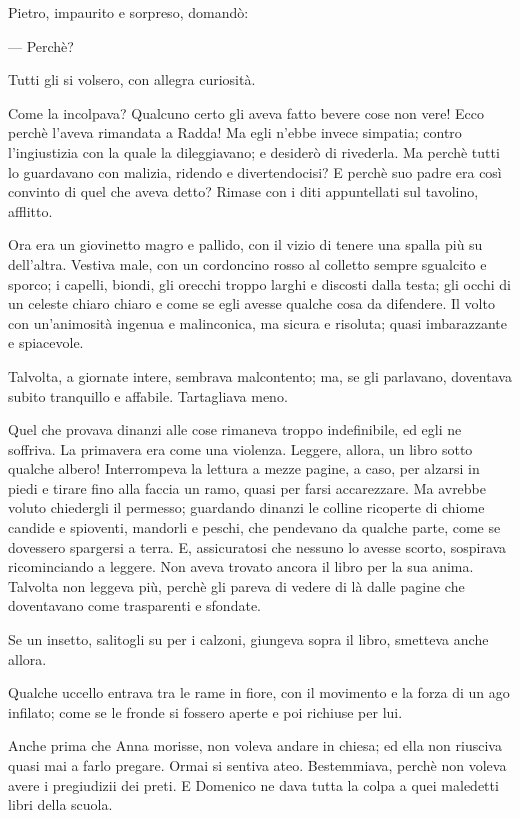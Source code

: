 Pietro, impaurito e sorpreso, domandò:

— Perchè?

Tutti gli si volsero, con allegra curiosità.

Come la incolpava? Qualcuno certo gli aveva fatto bevere cose non vere! Ecco perchè l'aveva rimandata a Radda! Ma egli n'ebbe invece simpatia; contro l'ingiustizia con la quale la dileggiavano; e desiderò di rivederla. Ma perchè tutti lo guardavano con malizia, ridendo e divertendocisi? E perchè suo padre era così convinto di quel che aveva detto? Rimase con i diti appuntellati sul tavolino, afflitto.

Ora era un giovinetto magro e pallido, con il vizio di tenere una spalla più su dell'altra. Vestiva male, con un cordoncino rosso al colletto sempre sgualcito e sporco; i capelli, biondi, gli orecchi troppo larghi e discosti dalla testa; gli occhi di un celeste chiaro chiaro e come se egli avesse qualche cosa da difendere. Il volto con un'animosità ingenua e malinconica, ma sicura e risoluta; quasi imbarazzante e spiacevole.

Talvolta, a giornate intere, sembrava malcontento; ma, se gli parlavano, doventava subito tranquillo e affabile. Tartagliava meno.

Quel che provava dinanzi alle cose rimaneva troppo indefinibile, ed egli ne soffriva. La primavera era come una violenza. Leggere, allora, un libro sotto qualche albero! Interrompeva la lettura a mezze pagine, a caso, per alzarsi in piedi e tirare fino alla faccia un ramo, quasi per farsi accarezzare. Ma avrebbe voluto chiedergli il permesso; guardando dinanzi le colline ricoperte di chiome candide e spioventi, mandorli e peschi, che pendevano da qualche parte, come se dovessero spargersi a terra. E, assicuratosi che nessuno lo avesse scorto, sospirava ricominciando a leggere. Non aveva trovato ancora il libro per la sua anima. Talvolta non leggeva più, perchè gli pareva di vedere di là dalle pagine che doventavano come trasparenti e sfondate.

Se un insetto, salitogli su per i calzoni, giungeva sopra il libro, smetteva anche allora.

Qualche uccello entrava tra le rame in fiore, con il movimento e la forza di un ago infilato; come se le fronde si fossero aperte e poi richiuse per lui.

Anche prima che Anna morisse, non voleva andare in chiesa; ed ella non riusciva quasi mai a farlo pregare. Ormai si sentiva ateo. Bestemmiava, perchè non voleva avere i pregiudizii dei preti. E Domenico ne dava tutta la colpa a quei maledetti libri della scuola.
